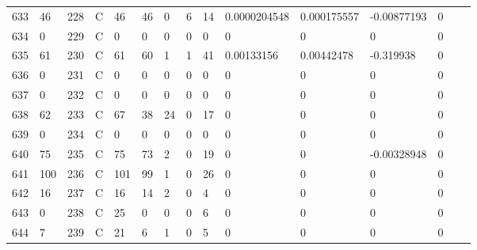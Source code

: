 \begin{longtable}{lllllllllllllll}
	633 & 46                & 228 & C   & 46                & 46                & 0                 & 6    & 14         & 0.0000204548   & 0.000175557    & -0.00877193   & 0            \\
	634 & 0                 & 229 & C   & 0                 & 0                 & 0                 & 0    & 0          & 0              & 0              & 0             & 0            \\
	635 & 61                & 230 & C   & 61                & 60                & 1                 & 1    & 41         & 0.00133156     & 0.00442478     & -0.319938     & 0            \\
	636 & 0                 & 231 & C   & 0                 & 0                 & 0                 & 0    & 0          & 0              & 0              & 0             & 0            \\
	637 & 0                 & 232 & C   & 0                 & 0                 & 0                 & 0    & 0          & 0              & 0              & 0             & 0            \\
	638 & 62                & 233 & C   & 67                & 38                & 24                & 0    & 17         & 0              & 0              & 0             & 0            \\
	639 & 0                 & 234 & C   & 0                 & 0                 & 0                 & 0    & 0          & 0              & 0              & 0             & 0            \\
	640 & 75                & 235 & C   & 75                & 73                & 2                 & 0    & 19         & 0              & 0              & -0.00328948   & 0            \\
	641 & 100               & 236 & C   & 101               & 99                & 1                 & 0    & 26         & 0              & 0              & 0             & 0            \\
	642 & 16                & 237 & C   & 16                & 14                & 2                 & 0    & 4          & 0              & 0              & 0             & 0            \\
	643 & 0                 & 238 & C   & 25                & 0                 & 0                 & 0    & 6          & 0              & 0              & 0             & 0            \\
	644 & 7                 & 239 & C   & 21                & 6                 & 1                 & 0    & 5          & 0              & 0              & 0             & 0            \\

\end{longtable}

